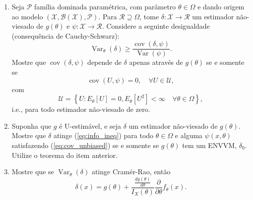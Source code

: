 \documentclass[a4paper,10pt, notitlepage]{report}
\newcommand{\vr}{\operatorname{Var}} %
\begin{document}
\begin{enumerate}
\begin{itemize}
    \end{itemize}
    \item Seja $\mathcal{P}$ família dominada paramétrica, com parâmetro $\theta \in \Omega$ e dando origem ao modelo $(\mathcal{X}, \mathcal{B}(\mathcal{X}), \mathcal{P})$.
    Para $\mathcal{R} \supseteq \Omega$, tome $\delta : \mathcal{X} \to \mathcal{R}$ um estimador não-viesado de $g(\theta)$ e $\psi : \mathcal{X} \to \mathcal{R}$.
    Considere a seguinte desigualdade (consequência de Cauchy-Schwarz):
    \begin{equation}
    \label{eq:info_ineq}
        \vr_\theta(\delta) \geq \frac{\operatorname{cov}(\delta, \psi)}{\vr(\psi)}.
    \end{equation}
     Mostre que \cite[Thm 1]{Blyth1974} $\operatorname{cov}(\delta, \psi)$ depende de $\delta$ apenas através de $g(\theta)$ se e somente se
     \begin{equation}
     \label{eq:cov_unbiased}
         \operatorname{cov}(U, \psi) = 0, \quad \forall U \in \mathcal{U},
     \end{equation}
     com 
     \begin{equation*}
         \mathcal{U} = \left\{U : E_\theta[U] = 0, E_\theta[U^2] < \infty \quad \forall \theta \in \Omega \right\},
     \end{equation*}
     i.e., para todo estimador não-viesado de zero.
    \item Suponha que $g$ é U-estimável, e seja $\delta$ um estimador não-viesado de $g(\theta)$.
    Mostre que $\delta$ atinge (\ref{eq:info_ineq}) para todo $\theta \in \Omega$ e alguma $\psi(x, \theta)$ satisfazendo (\ref{eq:cov_unbiased}) se e somente se $g(\theta)$ tem um ENVVM, $\delta_0$.
    Utilize o teorema do item anterior.
    \item Mostre que se $\vr_\theta(\delta)$ atinge Cramér-Rao, então 
    \begin{equation*}
        \delta(x) = g(\theta) + \frac{\frac{dg(\theta)}{d\theta}}{I_X(\theta)}\frac{\partial}{\partial\theta} f_\theta(x).
    \end{equation*}
\end{enumerate}





\end{document}
